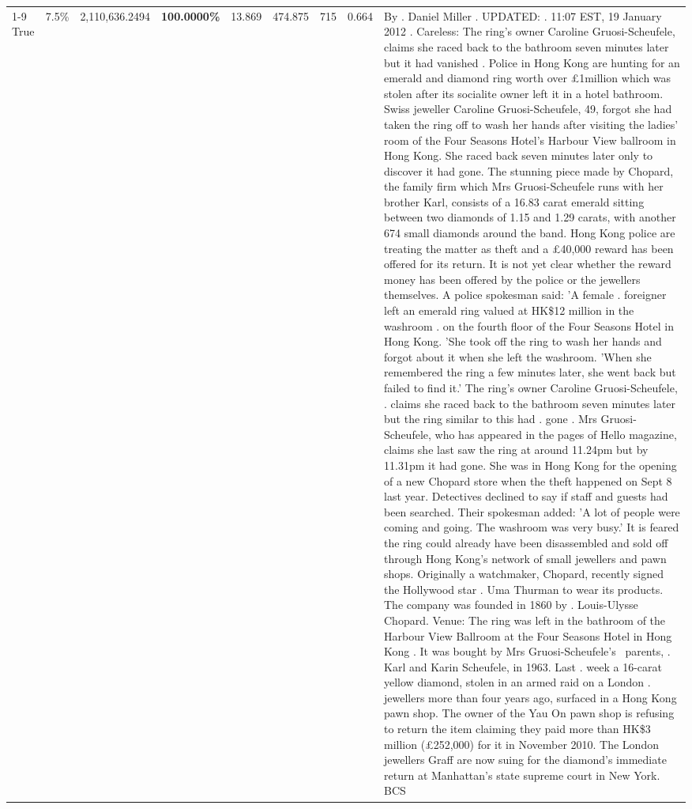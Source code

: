 \begin{table}[H]
\begin{tabular}{lllrlllll}
\cline{1-9}
True & 7.5\% & 2,110,636.2494 & \bfseries \color{red} 100.0000\% & 13.869 & 474.875 & 715 & 0.664 & By . Daniel Miller . UPDATED: . 11:07 EST, 19 January 2012 . Careless: The ring's owner Caroline Gruosi-Scheufele, claims she raced back to the bathroom seven minutes later but it had vanished . Police in Hong Kong are hunting for an emerald and diamond ring worth over £1million which was stolen after its socialite owner left it in a hotel bathroom. Swiss jeweller Caroline Gruosi-Scheufele, 49, forgot she had taken the ring off to wash her hands after visiting the ladies' room of the Four Seasons Hotel's Harbour View ballroom in Hong Kong. She raced back seven minutes later only to discover it had gone. The stunning piece made by Chopard, the family firm which Mrs Gruosi-Scheufele runs with her brother Karl, consists of a 16.83 carat emerald sitting between two diamonds of 1.15 and 1.29 carats, with another 674 small diamonds around the band. Hong Kong police are treating the matter as theft and a £40,000 reward has been offered for its return. It is not yet clear whether the reward money has been offered by the police or the jewellers themselves. A police spokesman said: 'A female . foreigner left an emerald ring valued at HK\$12 million in the washroom . on the fourth floor of the Four Seasons Hotel in Hong Kong. 'She took off the ring to wash her hands and forgot about it when she left the washroom. 'When she remembered the ring a few minutes later, she went back but failed to find it.' The ring's owner Caroline Gruosi-Scheufele, . claims she raced back to the bathroom seven minutes later but the ring similar to this had . gone . Mrs Gruosi-Scheufele, who has appeared in the pages of Hello magazine, claims she last saw the ring at around 11.24pm but by 11.31pm it had gone. She was in Hong Kong for the opening of a new Chopard store when the theft happened on Sept 8 last year. Detectives declined to say if staff and guests had been searched. Their spokesman added: 'A lot of people were coming and going. The washroom was very busy.' It is feared the ring could already have been disassembled and sold off through Hong Kong's network of small jewellers and pawn shops. Originally a watchmaker, Chopard, recently signed the Hollywood star . Uma Thurman to wear its products. The company was founded in 1860 by . Louis-Ulysse Chopard. Venue: The ring was left in the bathroom of the Harbour View Ballroom at the Four Seasons Hotel in Hong Kong . It was bought by Mrs Gruosi-Scheufele's  parents, . Karl and Karin Scheufele, in 1963. Last . week a 16-carat yellow diamond, stolen in an armed raid on a London . jewellers more than four years ago, surfaced in a Hong Kong pawn shop. The owner of the Yau On pawn shop is refusing to return the item claiming they paid more than HK\$3 million (£252,000) for it in November 2010. The London jewellers Graff are now suing for the diamond’s immediate return at Manhattan’s state supreme court in New York. BCS \\

\end{tabular}
\end{table}
